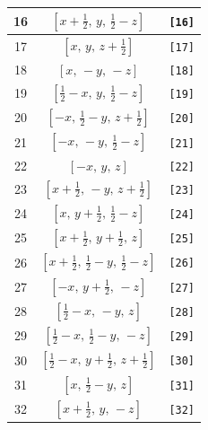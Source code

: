 \documentclass[fleqn,8pt]{jsarticle}
\begin{document}
\begin{longtable}{ccc}
16 & $\left[ x + \frac{1}{2},\, y,\, \frac{1}{2} - z \right]$ & {\tt [16]} \\ \hline
17 & $\left[ x,\, y,\, z + \frac{1}{2} \right]$ & {\tt [17]} \\ \hline
18 & $\left[ x,\, - y,\, - z \right]$ & {\tt [18]} \\ \hline
19 & $\left[ \frac{1}{2} - x,\, y,\, \frac{1}{2} - z \right]$ & {\tt [19]} \\ \hline
20 & $\left[ - x,\, \frac{1}{2} - y,\, z + \frac{1}{2} \right]$ & {\tt [20]} \\ \hline
21 & $\left[ - x,\, - y,\, \frac{1}{2} - z \right]$ & {\tt [21]} \\ \hline
22 & $\left[ - x,\, y,\, z \right]$ & {\tt [22]} \\ \hline
23 & $\left[ x + \frac{1}{2},\, - y,\, z + \frac{1}{2} \right]$ & {\tt [23]} \\ \hline
24 & $\left[ x,\, y + \frac{1}{2},\, \frac{1}{2} - z \right]$ & {\tt [24]} \\ \hline
25 & $\left[ x + \frac{1}{2},\, y + \frac{1}{2},\, z \right]$ & {\tt [25]} \\ \hline
26 & $\left[ x + \frac{1}{2},\, \frac{1}{2} - y,\, \frac{1}{2} - z \right]$ & {\tt [26]} \\ \hline
27 & $\left[ - x,\, y + \frac{1}{2},\, - z \right]$ & {\tt [27]} \\ \hline
28 & $\left[ \frac{1}{2} - x,\, - y,\, z \right]$ & {\tt [28]} \\ \hline
29 & $\left[ \frac{1}{2} - x,\, \frac{1}{2} - y,\, - z \right]$ & {\tt [29]} \\ \hline
30 & $\left[ \frac{1}{2} - x,\, y + \frac{1}{2},\, z + \frac{1}{2} \right]$ & {\tt [30]} \\ \hline
31 & $\left[ x,\, \frac{1}{2} - y,\, z \right]$ & {\tt [31]} \\ \hline
32 & $\left[ x + \frac{1}{2},\, y,\, - z \right]$ & {\tt [32]} \\
\end{longtable}
\end{document}
